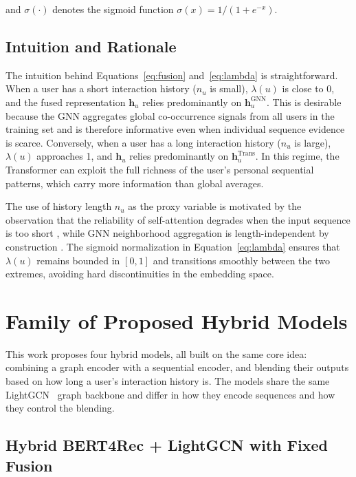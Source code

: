 \documentclass[12pt,a4paper]{report}
\begin{document}
\noindent and \(\sigma(\cdot)\) denotes the sigmoid function
\(\sigma(x) = 1/(1 + e^{-x})\).

\subsection{Intuition and Rationale}

The intuition behind Equations~\ref{eq:fusion} and~\ref{eq:lambda} is
straightforward. When a user has a short interaction history (\(n_u\) is
small), \(\lambda(u)\) is close to 0, and the fused representation
\(\mathbf{h}_u\) relies predominantly on \(\mathbf{h}_u^{\text{GNN}}\). This
is desirable because the GNN aggregates global co-occurrence signals from all
users in the training set and is therefore informative even when individual
sequence evidence is scarce. Conversely, when a user has a long interaction
history (\(n_u\) is large), \(\lambda(u)\) approaches 1, and \(\mathbf{h}_u\)
relies predominantly on \(\mathbf{h}_u^{\text{Trans}}\). In this regime, the
Transformer can exploit the full richness of the user's personal sequential
patterns, which carry more information than global averages.

The use of history length \(n_u\) as the proxy variable is motivated by the
observation that the reliability of self-attention degrades when the input
sequence is too short \citep{kang2018sasrec, sun2019bert4rec}, while GNN
neighborhood aggregation is length-independent by construction
\citep{he2020lightgcn}. The sigmoid normalization in
Equation~\ref{eq:lambda} ensures that \(\lambda(u)\) remains bounded in
\([0, 1]\) and transitions smoothly between the two extremes, avoiding hard
discontinuities in the embedding space.


\section{Family of Proposed Hybrid Models}
\label{sec:family}
\raggedright


This work proposes four hybrid models, all built on the same core idea:
combining a graph encoder with a sequential encoder, and blending their
outputs based on how long a user's interaction history is. The models share
the same LightGCN~\citep{he2020lightgcn} graph backbone and differ in how
they encode sequences and how they control the blending.

\subsection{Hybrid BERT4Rec + LightGCN with Fixed Fusion}
\label{sec:fixed}
\end{document}
